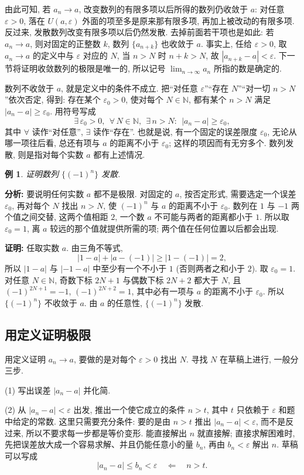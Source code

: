 \documentclass[UTF8,openany]{ctexbook}
\theoremstyle{chinesetextbook}
\newtheorem{example}{例}[section]
\newenvironment{cnproof}{\par\indent\textbf{证明:} \ignorespaces}{\par}
\begin{document}
由此可知, 若 $a_n\to a$, 改变数列的有限多项以后所得的数列仍收敛于 $a$: 对任意 $\varepsilon>0$, 落在 $U(a,\varepsilon)$ 外面的项至多是原来那有限多项, 再加上被改动的有限多项. 反过来, 发散数列改变有限多项以后仍然发散. 去掉前面若干项也是如此: 若 $a_n\to a$, 则对固定的正整数 $k$, 数列 $\{a_{n+k}\}$ 也收敛于 $a$. 事实上, 任给 $\varepsilon>0$, 取 $a_n\to a$ 的定义中与 $\varepsilon$ 对应的 $N$, 当 $n>N$ 时 $n+k>N$, 故 $|a_{n+k}-a|<\varepsilon$. 下一节将证明收敛数列的极限是唯一的, 所以记号 $\displaystyle\lim_{n\to\infty}a_n$ 所指的数是确定的.

数列不收敛于 $a$, 就是定义中的条件不成立. 把“对任意 $\varepsilon$”“存在 $N$”“对一切 $n>N$”依次否定, 得到: 存在某个 $\varepsilon_0>0$, 使对每个 $N\in\mathbb N$, 都有某个 $n>N$ 满足 $|a_n-a|\ge\varepsilon_0$. 用符号写成
\[
\exists\,\varepsilon_0>0,\ \ \forall\,N\in\mathbb N,\ \ \exists\,n>N:\ \ |a_n-a|\ge\varepsilon_0,
\]
其中 $\forall$ 读作“对任意”, $\exists$ 读作“存在”. 也就是说, 有一个固定的误差限度 $\varepsilon_0$, 无论从哪一项往后看, 总还有项与 $a$ 的距离不小于 $\varepsilon_0$; 这样的项因而有无穷多个. 数列发散, 则是指对每个实数 $a$ 都有上述情况.
\begin{example}
证明数列 $\{(-1)^n\}$ 发散.
\end{example}
\par\indent\textbf{分析:} 要说明任何实数 $a$ 都不是极限. 对固定的 $a$, 按否定形式, 需要选定一个误差 $\varepsilon_0$, 再对每个 $N$ 找出 $n>N$, 使 $(-1)^n$ 与 $a$ 的距离不小于 $\varepsilon_0$. 数列在 $1$ 与 $-1$ 两个值之间交替, 这两个值相距 $2$, 一个数 $a$ 不可能与两者的距离都小于 $1$. 所以取 $\varepsilon_0=1$, 离 $a$ 较远的那个值就提供所需的项; 两个值在任何位置以后都会出现.
\begin{cnproof}
任取实数 $a$. 由三角不等式,
\[
|1-a|+|a-(-1)|\ge|1-(-1)|=2,
\]
所以 $|1-a|$ 与 $|-1-a|$ 中至少有一个不小于 $1$ (否则两者之和小于 $2$). 取 $\varepsilon_0=1$. 对任意 $N\in\mathbb N$, 奇数下标 $2N+1$ 与偶数下标 $2N+2$ 都大于 $N$, 且 $(-1)^{2N+1}=-1$, $(-1)^{2N+2}=1$, 其中必有一项与 $a$ 的距离不小于 $\varepsilon_0$. 所以 $\{(-1)^n\}$ 不收敛于 $a$. 由 $a$ 的任意性, $\{(-1)^n\}$ 发散.
\end{cnproof}
\subsection{用定义证明极限}
用定义证明 $a_n\to a$, 要做的是对每个 $\varepsilon>0$ 找出 $N$. 寻找 $N$ 在草稿上进行, 一般分三步.

(1) 写出误差 $|a_n-a|$ 并化简.

(2) 从 $|a_n-a|<\varepsilon$ 出发, 推出一个使它成立的条件 $n>t$, 其中 $t$ 只依赖于 $\varepsilon$ 和题中给定的常数. 这里只需要充分条件: 要的是由 $n>t$ 推出 $|a_n-a|<\varepsilon$, 而不是反过来, 所以不要求每一步都是等价变形. 能直接解出 $n$ 就直接解; 直接求解困难时, 先把误差放大成一个容易求解、并且仍能任意小的量 $b_n$, 再由 $b_n<\varepsilon$ 解出 $n$. 草稿可以写成
\[
|a_n-a|\le b_n<\varepsilon\quad\Longleftarrow\quad n>t.
\]
\end{document}
